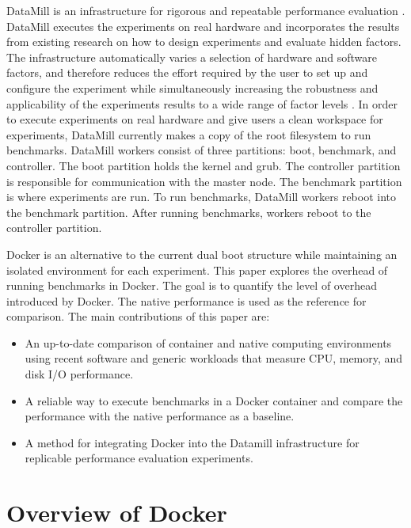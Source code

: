 \documentclass[11pt]{article}
\begin{document}
	DataMill is an infrastructure for rigorous and repeatable performance evaluation \cite{augusto}. DataMill executes the experiments on real hardware and incorporates the results from existing research on how to design experiments and evaluate hidden factors. The infrastructure automatically varies a selection of hardware and software factors, and therefore reduces the effort required by the user to set up and configure the experiment while simultaneously increasing the robustness and applicability of the experiments results to a wide range of factor levels \cite{augusto}. In order to execute experiments on real hardware and give users a clean workspace for experiments, DataMill currently makes a copy of the root filesystem to run benchmarks. DataMill workers consist of three partitions: boot, benchmark, and controller. The boot partition holds the kernel and grub. The controller partition is responsible for communication with the master node. The benchmark partition is where experiments are run. To run benchmarks, DataMill workers reboot into the benchmark partition. After running benchmarks, workers reboot to the controller partition.
	
	Docker is an alternative to the current dual boot structure while maintaining an isolated environment for each experiment. This paper explores the overhead of running benchmarks in Docker. The goal is to quantify the level of overhead introduced by Docker. The native performance is used as the reference for comparison. The main contributions of this paper are:
	\begin{itemize}
		\item An up-to-date comparison of container and native computing environments using recent software and generic workloads that measure CPU, memory, and disk I/O performance.
		\item A reliable way to execute benchmarks in a Docker container and compare the performance with the native performance as a baseline.
		\item A method for integrating Docker into the Datamill infrastructure for replicable performance evaluation experiments.
	\end{itemize}
	
	\section{Overview of Docker}
	
\end{document}
